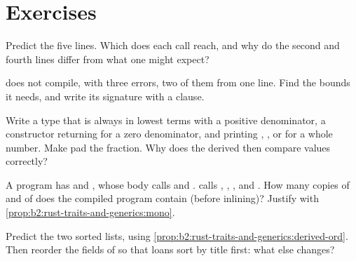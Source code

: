 \section{Exercises}\label{sec:b2:rust-traits-and-generics:exercises}

\begin{exercise}[$\star$]\label{exo:b2:rust-traits-and-generics:1}
Predict the five lines. Which  does each call reach, and why do the second and fourth lines differ from
what one might expect?
\end{exercise}

\begin{exercise}[$\star$]\label{exo:b2:rust-traits-and-generics:2}
 does not compile, with three errors, two of them from one line. Find the bounds it needs, and write its signature with a
 clause.
\end{exercise}

\begin{exercise}[$\star$]\label{exo:b2:rust-traits-and-generics:3}
Write a type  that is always in lowest terms with a positive denominator, a constructor returning
 for a zero denominator, and  printing , , or  for a whole
number. Make  pad the fraction. Why does the derived  then compare values
correctly?
\end{exercise}

\begin{exercise}[$\star$]\label{exo:b2:rust-traits-and-generics:4}
A program has  and , whose body
calls  and .  calls , , ,
 and . How many copies of  and of  does the compiled
program contain (before inlining)? Justify with \cref{prop:b2:rust-traits-and-generics:mono}.
\end{exercise}

\begin{exercise}[$\star\star$]\label{exo:b2:rust-traits-and-generics:5}
Predict the two sorted lists, using \cref{prop:b2:rust-traits-and-generics:derived-ord}. Then reorder the fields of
 so that loans sort by title first: what else changes?
\end{exercise}

